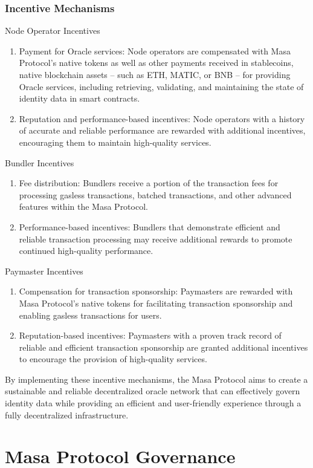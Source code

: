 \documentclass{article}
\begin{document}
\subsubsection{Incentive Mechanisms}
Node Operator Incentives
\begin{enumerate}
\item Payment for Oracle services: Node operators are compensated with Masa Protocol's native tokens as well as other payments received in stablecoins, native blockchain assets – such as ETH, MATIC, or BNB – for providing Oracle services, including retrieving, validating, and maintaining the state of identity data in smart contracts.
\item Reputation and performance-based incentives: Node operators with a history of accurate and reliable performance are rewarded with additional incentives, encouraging them to maintain high-quality services.
\end{enumerate}
Bundler Incentives

\begin{enumerate}
\item Fee distribution: Bundlers receive a portion of the transaction fees for processing gasless transactions, batched transactions, and other advanced features within the Masa Protocol.
\item Performance-based incentives: Bundlers that demonstrate efficient and reliable transaction processing may receive additional rewards to promote continued high-quality performance.
\end{enumerate}
Paymaster Incentives

\begin{enumerate}
\item Compensation for transaction sponsorship: Paymasters are rewarded with Masa Protocol's native tokens for facilitating transaction sponsorship and enabling gasless transactions for users.
\item Reputation-based incentives: Paymasters with a proven track record of reliable and efficient transaction sponsorship are granted additional incentives to encourage the provision of high-quality services.
\end{enumerate}
By implementing these incentive mechanisms, the Masa Protocol aims to create a sustainable and reliable decentralized oracle network that can effectively govern identity data while providing an efficient and user-friendly experience through a fully decentralized infrastructure.

\section{Masa Protocol Governance}
\end{document}
